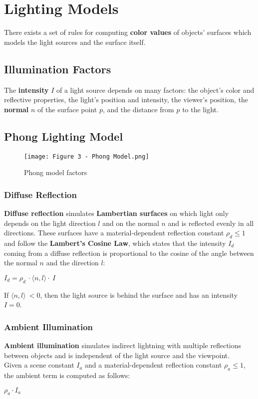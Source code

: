 \documentclass{article}
\begin{document}
\section{Lighting Models}
There exists a set of rules for computing \textbf{color values} of objects' surfaces which models the light sources and the surface itself.
\subsection{Illumination Factors}
The \textbf{intensity} $I$ of a light source depends on many factors: the object's color and reflective properties, the light's position and intensity, the viewer's position, the \textbf{normal} $n$ of the surface point $p$, and the distance from $p$ to the light.
\subsection{Phong Lighting Model}
\begin{figure}[H]
    \centering
    \texttt{[image: Figure 3 - Phong Model.png]}
    \caption{Phong model factors}
\end{figure}
\subsubsection{Diffuse Reflection}
\textbf{Diffuse reflection} simulates \textbf{Lambertian surfaces} on which light only depends on the light direction $l$ and on the normal $n$ and is reflected evenly in all directions. These surfaces have a material-dependent reflection constant $\rho_d \leq 1$ and follow the \textbf{Lambert's Cosine Law}, which states that the intensity $I_d$ coming from a diffuse reflection is proportional to the cosine of the angle between the normal $n$ and the direction $l$:
\begin{center}
    $I_d = \rho_d \ \cdot \langle n,l\rangle \cdot \ I$
\end{center}
If $\langle n,l\rangle \ < 0$, then the light source is behind the surface and has an intensity $I = 0$.
\subsubsection{Ambient Illumination}
\textbf{Ambient illumination} simulates indirect lightning with multiple reflections between objects and is independent of the light source and the viewpoint. \\ Given a scene constant $I_a$ and a material-dependent reflection constant $\rho_a \leq 1$, the ambient term is computed as follows:
\begin{center}
    $ \rho_a \cdot I_a $
\end{center}
\end{document}
